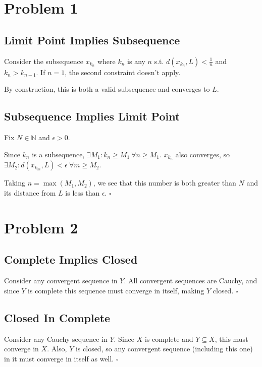 \documentclass[12pt]{article}
\newcommand{\N}{\mathbb{N}}
\begin{document}
\section{Problem 1}

\subsection{Limit Point Implies Subsequence}

Consider the subsequence $x_{k_n}$ where
$k_n$ is any $n$ s.t. $d(x_{k_n}, L) < \frac{1}{n}$ and $k_n > k_{n-1}$.
If $n=1$, the second constraint doesn't apply.

By construction, this is both a valid subsequence and converges to $L$.

\subsection{Subsequence Implies Limit Point}

Fix $N \in \N$ and $\epsilon > 0$.

Since $k_n$ is a subsequence, $\exists M_1: k_n \ge M_1\ \forall n \ge M_1$.
$x_{k_n}$ also converges, so $\exists M_2: d(x_{k_m}, L) < \epsilon\ \forall m \ge M_2$.

Taking $n = \max(M_1, M_2)$, we see that this number is both greater than $N$
and its distance from $L$ is less than $\epsilon$. $\square$

\section{Problem 2}

\subsection{Complete Implies Closed}

Consider any convergent sequence in $Y$.
All convergent sequences are Cauchy, and since $Y$ is complete
this sequence must converge in itself, making $Y$ closed. $\square$

\subsection{Closed In Complete}

Consider any Cauchy sequence in $Y$.
Since $X$ is complete and $Y \subseteq X$, this must converge in $X$.
Also, $Y$ is closed, so any convergent sequence (including this one) in it
must converge in itself as well. $\square$
\end{document}
